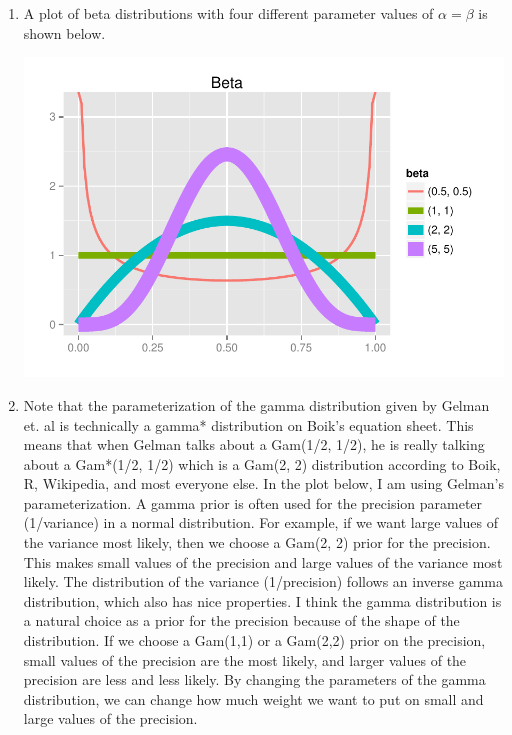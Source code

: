 \documentclass[12pt]{article}\usepackage[]{graphicx}\usepackage[]{color}
\newenvironment{knitrout}{}{} %
\begin{document}
\begin{doublespacing}
\begin{enumerate}
\item A plot of beta distributions with four different parameter values of $\alpha=\beta$ is shown below.

\begin{center}
\begin{knitrout}\footnotesize
{}\color{fgcolor}
\includegraphics[width=0.8\linewidth]{figure/betaplot-1} 

\end{knitrout}
\end{center}

\item Note that the parameterization of the gamma distribution given by Gelman et. al is technically a gamma* distribution on Boik's equation sheet. This means that when Gelman talks about a Gam(1/2, 1/2), he is really talking about a Gam*(1/2, 1/2) which is a Gam(2, 2) distribution according to Boik, R, Wikipedia, and most everyone else. In the plot below, I am using Gelman's parameterization. A gamma prior is often used for the precision parameter (1/variance) in a normal distribution. For example, if we want large values of the variance most likely, then we choose a Gam(2, 2) prior for the precision. This makes small values of the precision and large values of the variance most likely. The distribution of the variance (1/precision) follows an inverse gamma distribution, which also has nice properties. I think the gamma distribution is a natural choice as a prior for the precision because of the shape of the distribution. If we choose a Gam(1,1) or a Gam(2,2) prior on the precision, small values of the precision are the most likely, and larger values of the precision are less and less likely. By changing the parameters of the gamma distribution, we can change how much weight we want to put on small and large values of the precision. \\


\end{enumerate}
\end{doublespacing}
\end{document}
